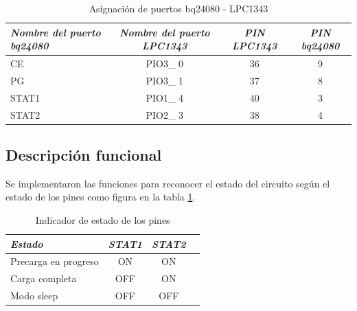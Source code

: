 {\begin{table}[ht]
	\centering
	\caption{Asignación de puertos bq24080 - LPC1343}
	\begin{tabular}{@{} l *3c @{}}    \toprule
		\emph{\textbf{Nombre del puerto bq24080}} & \emph{\textbf{Nombre del puerto LPC1343}} & \emph{\textbf{PIN LPC1343}} & \emph{\textbf{PIN bq24080}}\\
		\midrule
		CE &  PIO3\_ 0 & 36 & 9	\\	
		PG	&  PIO3\_ 1 & 37 & 8\\
		STAT1 &  PIO1\_ 4 & 40 & 3\\
		STAT2 &  PIO2\_ 3 & 38 & 4\\

		\bottomrule
		\hline
	\end{tabular}
	\label{tab:bq}
\end{table}






\subsection{Descripción funcional}
\label{subsec:func} 

Se implementaron las funciones para reconocer el estado del circuito según el estado de los pines como figura en la tabla \ref{tab:bq}.

\begin{table}[ht]
	\centering
	\caption{Indicador de estado de los pines}
	\begin{tabular}{@{} l *3c @{}}    \toprule
		\emph{\textbf{Estado}} & \emph{\textbf{STAT1}} & \emph{\textbf{STAT2}}\\
		\midrule
		Precarga en progreso &  ON & ON \\	
		Carga completa &  OFF & ON \\
		Modo sleep &  OFF & OFF \\


\end{tabular}
\end{table}}
